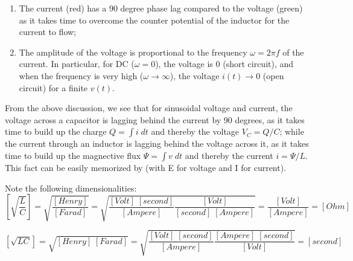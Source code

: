\documentclass{article}
\begin{document}
\begin{itemize}

  \begin{enumerate}
  \item The current (red) has a 90 degree phase lag compared to the 
    voltage (green) as it takes time to overcome the counter potential 
    of the inductor for the current to flow;
  \item The amplitude of the voltage is proportional to the frequency
    $\omega=2\pi f$ of the current. In particular, for DC ($\omega=0$), 
    the voltage is 0 (short circuit), and when the frequency is very 
    high ($\omega \rightarrow \infty$), the voltage $i(t) \rightarrow 0$
    (open circuit) for a finite $v(t)$.
  \end{enumerate}

  From the above discussion, we see that for sinusoidal voltage and
  current, the voltage across a capacitor is lagging behind the current
  by 90 degrees, as it takes time to build up the charge $Q=\int i\;dt$ 
  and thereby the voltage $V_C=Q/C$; while the current through an inductor
  is lagging behind the voltage across it, as it takes time to build up 
  the magnective flux $\Psi=\int v\;dt$ and thereby the current $i=\Psi/L$.
  This fact can be easily memorized by 
  (with E for voltage and I for current).

  Note the following dimensionalities:
  \begin{equation} 
    \left[\sqrt{\frac{L}{C}}\right]=\sqrt{\frac{[Henry]}{[Farad]}}
    =\sqrt{\frac{[Volt]\;[second]}{[Ampere]}\frac{[Volt]}{[second]\;[Ampere]}}
    =\frac{[Volt]}{[Ampere]}=[Ohm] 
  \end{equation}

  \begin{comment}
  \begin{equation} 
    \left[\sqrt{\frac{L}{C}}\right]=\sqrt{\frac{H}{F}}
    =\sqrt{\frac{V\;s}{A}\;\;\frac{V}{s\;A}}=\frac{V}{A}=\Omega
  \end{equation}
  \end{comment}

  \begin{equation} 
    \left[ \sqrt{LC} \right]=\sqrt{[Henry]\;[Farad]}
    =\sqrt{\frac{[Volt]\;[second]}{[Ampere]}\frac{[Ampere]\;[second]}{[Volt]}}
    =[second]
  \end{equation}

  \begin{comment}
  \begin{equation} 
    \left[\sqrt{LC}\right]=\sqrt{H\; F}=\sqrt{ \frac{V\;s}{A} \frac{A\;s}{V} }
    =s
  \end{equation}
  \end{comment}


\end{itemize}
\end{document}
